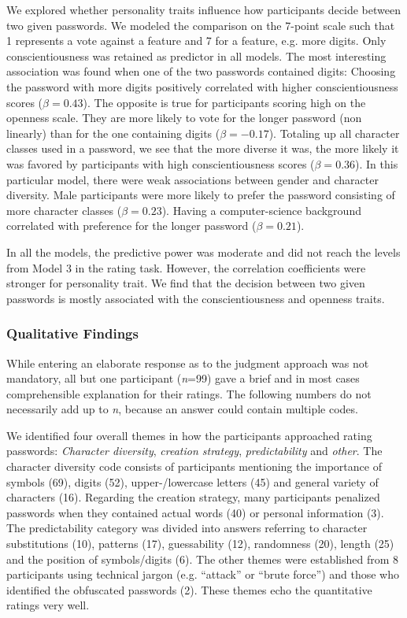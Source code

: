 We explored whether personality traits influence how participants decide between two given passwords. We modeled the comparison on the 7-point scale such that 1 represents a vote against a feature and 7 for a feature, e.g. more digits. Only conscientiousness was retained as predictor in all models. The most interesting association was found when one of the two passwords contained digits: Choosing the password with more digits positively correlated with higher conscientiousness scores ($\beta = 0.43$). The opposite is true for participants scoring high on the openness scale. They are more likely to vote for the longer password (non linearly) than for the one containing digits ($\beta = -0.17$). Totaling up all character classes used in a password, we see that the more diverse it was, the more likely it was favored by participants with high conscientiousness scores ($\beta = 0.36$). 
In this particular model, there were weak associations between gender and character diversity. Male participants were more likely to prefer the password consisting of more character classes ($\beta = 0.23$). Having a computer-science background correlated with preference for the longer password ($\beta = 0.21$).

In all the models, the predictive power was moderate and did not reach the levels from Model 3 in the rating task. However, the correlation coefficients were stronger for personality trait. We find that the decision between two given passwords is mostly associated with the conscientiousness and openness traits.



%

\subsubsection{Qualitative Findings}
While entering an elaborate response as to the judgment approach was not mandatory, all but one participant (\textit{n}=99) gave a brief and in most cases comprehensible explanation for their ratings. The following numbers do not necessarily add up to \textit{n}, because an answer could contain multiple codes.

We identified four overall themes in how the participants approached rating passwords: \textit{Character diversity}, \textit{creation strategy}, \textit{predictability} and \textit{other}. The character diversity code consists of participants mentioning the importance of symbols (69), digits (52), upper-/lowercase letters (45) and general variety of characters (16). Regarding the creation strategy, many participants penalized passwords when they contained actual words (40) or personal information (3). The predictability category was divided into answers referring to character substitutions (10), patterns (17), guessability (12), randomness (20), length (25) and the position of symbols/digits (6). The other themes were established from 8 participants using technical jargon (e.g. ``attack'' or ``brute force'') and those who identified the obfuscated passwords (2). These themes echo the quantitative ratings very well. 

